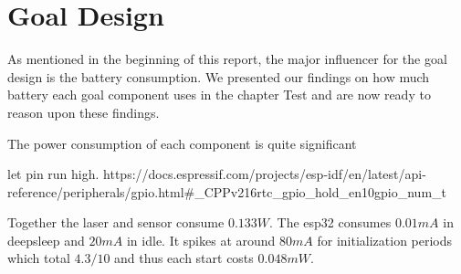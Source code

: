 \section{Goal Design}
As mentioned in the beginning of this report, the major influencer for the goal design is the battery consumption. We presented our findings on how much battery each goal component uses in the chapter Test and are now ready to reason upon these findings.

The power consumption of each component is quite significant

let pin run high.
https://docs.espressif.com/projects/esp-idf/en/latest/api-reference/peripherals/gpio.html#_CPPv216rtc_gpio_hold_en10gpio_num_t




Together the laser and sensor consume $0.133W$. The esp32 consumes $0.01mA$ in deepsleep and $20mA$ in idle. It spikes at around $80mA$ for initialization periods which total $4.3/10$ and thus each start costs $0.048mW$.